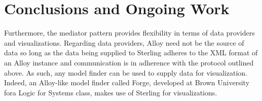 \documentclass[runningheads]{llncs}
\begin{document}

\section{Conclusions and Ongoing Work}
\label{conclusions}

Furthermore, the mediator pattern provides flexibility in terms of data providers and visualizations. Regarding data providers, Alloy need not be the source of data so long as the data being supplied to Sterling adheres to the XML format of an Alloy instance and communication is in adherence with the protocol outlined above. As such, any model finder can be used to supply data for visualization. Indeed, an Alloy-like model finder called Forge, developed at Brown University fora Logic for Systems class, makes use of Sterling for visualizations.



\end{document}
